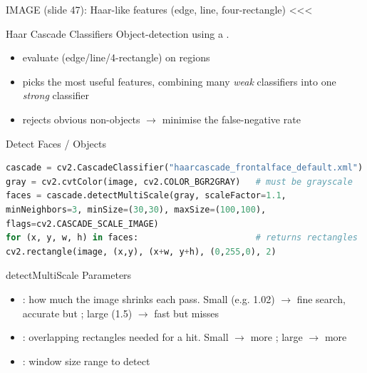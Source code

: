 IMAGE (slide 47): Haar-like features (edge, line, four-rectangle) <<<

\begin{concept}{Haar Cascade Classifiers}
    Object-detection using a .
    \begin{itemize}
        \item evaluate  (edge/line/4-rectangle) on regions
        \item {} picks the most useful features, combining many
              \emph{weak} classifiers into one \emph{strong} classifier
        \item {} rejects obvious non-objects 
              $\to$ minimise the false-negative rate
    \end{itemize}
\end{concept}

\begin{KR}{Detect Faces / Objects}
\begin{lstlisting}[language=Python, style=basesmol, aboveskip=2pt, belowskip=2pt]
cascade = cv2.CascadeClassifier("haarcascade_frontalface_default.xml")
gray = cv2.cvtColor(image, cv2.COLOR_BGR2GRAY)   # must be grayscale
faces = cascade.detectMultiScale(gray, scaleFactor=1.1,
minNeighbors=3, minSize=(30,30), maxSize=(100,100),
flags=cv2.CASCADE_SCALE_IMAGE)
for (x, y, w, h) in faces:                       # returns rectangles
cv2.rectangle(image, (x,y), (x+w, y+h), (0,255,0), 2)
\end{lstlisting}
\end{KR}

\begin{definition}{detectMultiScale Parameters}
    \begin{itemize}
        \item {}: how much the image shrinks each pass.
              Small (e.g. 1.02) $\to$ fine search, accurate but ;
              large (1.5) $\to$ fast but misses
        \item {}: overlapping rectangles needed for a hit.
              Small $\to$ more ; large $\to$ more 
        \item {}: window size range to detect
    \end{itemize}
\end{definition}

